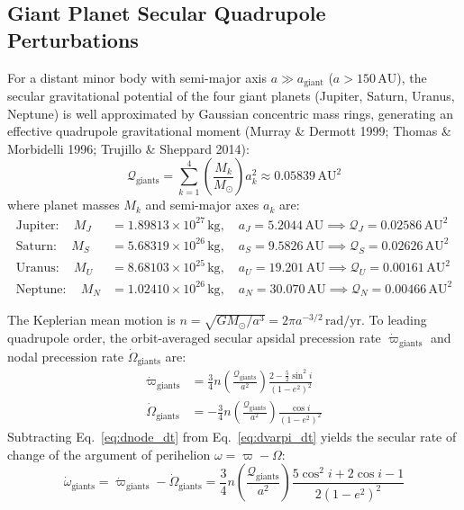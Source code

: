 \documentclass[11pt,a4paper]{article}
\begin{document}
\subsection{Giant Planet Secular Quadrupole Perturbations}
For a distant minor body with semi-major axis $a \gg a_{\text{giant}}$ ($a > 150\,\text{AU}$), the secular gravitational potential of the four giant planets (Jupiter, Saturn, Uranus, Neptune) is well approximated by Gaussian concentric mass rings, generating an effective quadrupole gravitational moment (Murray \& Dermott 1999; Thomas \& Morbidelli 1996; Trujillo \& Sheppard 2014):
\begin{equation}
\mathcal{Q}_{\text{giants}} = \sum_{k=1}^4 \left(\frac{M_k}{M_\odot}\right) a_k^2 \approx 0.05839\,\text{AU}^2
\label{eq:quadrupole_sum}
\end{equation}
where planet masses $M_k$ and semi-major axes $a_k$ are:
\begin{align}
\text{Jupiter}: \quad M_J &= 1.89813\times 10^{27}\,\text{kg}, \quad a_J = 5.2044\,\text{AU} \implies \mathcal{Q}_J = 0.02586\,\text{AU}^2 \\
\text{Saturn}: \quad M_S &= 5.68319\times 10^{26}\,\text{kg}, \quad a_S = 9.5826\,\text{AU} \implies \mathcal{Q}_S = 0.02626\,\text{AU}^2 \\
\text{Uranus}: \quad M_U &= 8.68103\times 10^{25}\,\text{kg}, \quad a_U = 19.201\,\text{AU} \implies \mathcal{Q}_U = 0.00161\,\text{AU}^2 \\
\text{Neptune}: \quad M_N &= 1.02410\times 10^{26}\,\text{kg}, \quad a_N = 30.070\,\text{AU} \implies \mathcal{Q}_N = 0.00466\,\text{AU}^2
\end{align}

The Keplerian mean motion is $n = \sqrt{G M_\odot / a^3} = 2\pi a^{-3/2}\,\text{rad/yr}$. To leading quadrupole order, the orbit-averaged secular apsidal precession rate $\dot{\varpi}_{\text{giants}}$ and nodal precession rate $\dot{\Omega}_{\text{giants}}$ are:
\begin{align}
\dot{\varpi}_{\text{giants}} &= \frac{3}{4} n \left(\frac{\mathcal{Q}_{\text{giants}}}{a^2}\right) \frac{2 - \frac{5}{2}\sin^2 i}{(1 - e^2)^2} \label{eq:dvarpi_dt} \\
\dot{\Omega}_{\text{giants}} &= -\frac{3}{4} n \left(\frac{\mathcal{Q}_{\text{giants}}}{a^2}\right) \frac{\cos i}{(1 - e^2)^2} \label{eq:dnode_dt}
\end{align}
Subtracting Eq.~\eqref{eq:dnode_dt} from Eq.~\eqref{eq:dvarpi_dt} yields the secular rate of change of the argument of perihelion $\omega = \varpi - \Omega$:
\begin{equation}
\dot{\omega}_{\text{giants}} = \dot{\varpi}_{\text{giants}} - \dot{\Omega}_{\text{giants}} = \frac{3}{4} n \left(\frac{\mathcal{Q}_{\text{giants}}}{a^2}\right) \frac{5\cos^2 i + 2\cos i - 1}{2(1 - e^2)^2}
\label{eq:domega_dt}
\end{equation}
\end{document}
